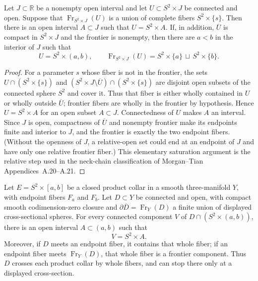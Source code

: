 \begin{lemma}
\label{lem:fiber-saturation-from-spherical-frontier}
\notready
Let $J\subset\mathbb R$ be a nonempty open interval and let
$U\subset S^2\times J$ be connected and open.  Suppose that
$\operatorname{Fr}_{S^2\times J}(U)$ is a union of complete fibers
$S^2\times\{s\}$.  Then there is an open interval $A\subset J$ such that
$U=S^2\times A$.  If, in addition, $\overline U$ is compact in
$S^2\times J$ and the frontier is nonempty, then there are $a<b$ in the
interior of $J$ such that
\[
 U=S^2\times(a,b),\qquad
 \operatorname{Fr}_{S^2\times J}(U)
 =S^2\times\{a\}\,\sqcup\,S^2\times\{b\}.
\]
\end{lemma}

\begin{proof}
For a parameter $s$ whose fiber is not in the frontier, the sets
$U\cap(S^2\times\{s\})$ and
$(S^2\times J\setminus\overline U)\cap(S^2\times\{s\})$ are disjoint open
subsets of the connected sphere $S^2$ and cover it.  Thus that fiber is
either wholly contained in $U$ or wholly outside $\overline U$; frontier
fibers are wholly in the frontier by hypothesis.  Hence
$U=S^2\times A$ for an open subset $A\subset J$.  Connectedness of $U$
makes $A$ an interval.  Since $J$ is open, compactness of $\overline U$ and
nonempty frontier make its endpoints finite and interior to $J$, and the
frontier is exactly the two endpoint fibers.  (Without the openness of $J$, a
relative-open set could end at an endpoint of $J$ and have only one relative
frontier fiber.)  This elementary saturation argument is the
relative step used in the neck-chain classification of Morgan--Tian
Appendices~A.20--A.21.
\end{proof}

\begin{lemma}
\label{lem:closed-collar-fiber-saturation}
\notready
Let $E=S^2\times[a,b]$ be a closed product collar in a smooth
three-manifold $Y$, with endpoint fibers $F_a$ and $F_b$.  Let $D\subset Y$ be
connected and open, with compact smooth codimension-zero closure and
\(\partial\overline D=\operatorname{Fr}_Y(D)\) a finite union of displayed
cross-sectional spheres.  For every connected component $V$ of
$D\cap(S^2\times(a,b))$, there is an open interval $A\subset(a,b)$ such that
\[
 V=S^2\times A.
\]
Moreover, if $D$ meets an endpoint fiber, it contains that whole fiber; if an
endpoint fiber meets $\operatorname{Fr}_Y(D)$, that whole fiber is a frontier
component.  Thus $D$ crosses each product collar by whole fibers, and can stop
there only at a displayed cross-section.
\end{lemma}

